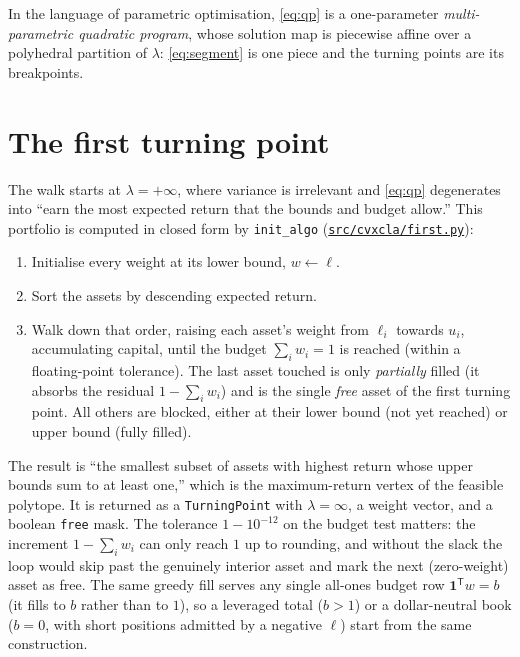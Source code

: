 \documentclass[11pt]{article}
\newcommand{\lb}{\ell}              %
\newcommand{\ub}{u}                 %
\newcommand{\trans}{^{\mathsf{T}}}
\newcommand{\repourl}{https://github.com/cvxgrp/cvxcla}
\newcommand{\srcref}{v1.8.1}
\newcommand{\srcfile}[2]{\href{\repourl/blob/\srcref/#1}{\texttt{#2}}}
\begin{document}
In the language of parametric optimisation, \eqref{eq:qp} is a one-parameter
\emph{multi-parametric quadratic program}, whose solution map is piecewise affine
over a polyhedral partition of $\lambda$: \eqref{eq:segment} is one piece and the
turning points are its breakpoints.

\section{The first turning point}
\label{sec:first}

The walk starts at $\lambda = +\infty$, where variance is irrelevant and \eqref{eq:qp}
degenerates into ``earn the most expected return that the bounds and budget allow.''
This portfolio is computed in closed form by \texttt{init\_algo}
(\srcfile{src/cvxcla/first.py}{src/cvxcla/first.py}):

\begin{enumerate}
\item Initialise every weight at its lower bound, $w \gets \lb$.
\item Sort the assets by descending expected return.
\item Walk down that order, raising each asset's weight from $\lb_i$ towards $\ub_i$,
      accumulating capital, until the budget $\sum_i w_i = 1$ is reached (within a
      floating-point tolerance). The last asset touched is only \emph{partially}
      filled (it absorbs the residual $1 - \sum_i w_i$) and is the single
      \emph{free} asset of the first turning point. All others are blocked, either at
      their lower bound (not yet reached) or upper bound (fully filled).
\end{enumerate}

The result is ``the smallest subset of assets with highest return whose upper bounds
sum to at least one,'' which is the maximum-return vertex of the feasible polytope. It
is returned as a \texttt{TurningPoint} with $\lambda = \infty$, a weight vector, and a
boolean \texttt{free} mask. The tolerance $1-10^{-12}$ on the budget test matters: the
increment $1 - \sum_i w_i$ can only reach $1$ up to rounding, and without the slack the
loop would skip past the genuinely interior asset and mark the next (zero-weight) asset
as free. The same greedy fill serves any single all-ones budget row $\mathbf{1}\trans w
= b$ (it fills to $b$ rather than to $1$), so a leveraged total ($b > 1$) or a
dollar-neutral book ($b = 0$, with short positions admitted by a negative $\lb$) start
from the same construction.
\end{document}
